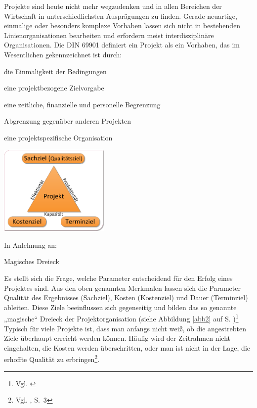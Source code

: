 Projekte sind heute nicht mehr wegzudenken und in allen Bereichen der Wirtschaft in unterschiedlichsten Ausprägungen zu finden. Gerade neuartige, einmalige oder besonders komplexe Vorhaben lassen sich nicht in bestehenden Linienorganisationen bearbeiten und erfordern meist interdisziplinäre Organisationen. \label{69901Projekt} Die DIN 69901 definiert ein Projekt als ein Vorhaben, das im Wesentlichen gekennzeichnet ist durch:
\begin{compactitem}
\item die Einmaligkeit der Bedingungen 
\item eine projektbezogene Zielvorgabe 
\item eine zeitliche, finanzielle und personelle Begrenzung 
\item Abgrenzung gegenüber anderen Projekten 
\item eine projektspezifische Organisation
\end{compactitem}
\begin{floatingfigure}[r]{0.4\textwidth} 
\includegraphics[width=0.4\textwidth]{Images/magischesDreieck.png}
\begin{center}
   {\footnotesize In Anlehnung an: \cite{Wischnewski1991}}
   \caption[Magisches Dreieck]{Magisches Dreieck}\label{abb2}
\end{center}
\end{floatingfigure}\noindent
Es stellt sich die Frage, welche Parameter entscheidend für den Erfolg eines Projektes sind. Aus den oben genannten Merkmalen lassen sich die Parameter Qualität des Ergebnisses (Sachziel), Kosten (Kostenziel) und Dauer (Terminziel) ableiten. Diese Ziele beeinflussen sich gegenseitig und bilden das so genannte „magische“ Dreieck der Projektorganisation (siehe Abbildung \ref{abb2} auf S. \pageref{abb2})\footnote{Vgl. \cite{Wegmann&Winklbauer2006}}
Typisch für viele Projekte ist, dass man anfangs nicht weiß, ob die angestrebten Ziele überhaupt erreicht werden können. Häufig wird der Zeitrahmen nicht eingehalten, die Kosten werden überschritten, oder man ist nicht in der Lage, die erhoffte Qualität zu erbringen\footnote{Vgl. \cite{Fiedler2008}, S.~3}.

